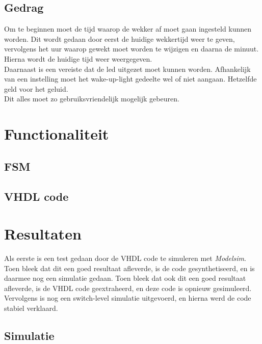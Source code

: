 \subsection{Gedrag}
Om te beginnen moet de tijd waarop de wekker af moet gaan ingesteld kunnen worden. Dit wordt gedaan door eerst de huidige wekkertijd weer te geven, vervolgens het uur waarop gewekt moet worden te wijzigen en daarna de minuut. Hierna wordt de huidige tijd weer weergegeven. \\
Daarnaast is een vereiste dat de led uitgezet moet kunnen worden. Afhankelijk van een instelling moet het wake-up-light gedeelte wel of niet aangaan. Hetzelfde geld voor het geluid. \\
Dit alles moet zo gebruiksvriendelijk mogelijk gebeuren.

\section{Functionaliteit}

\subsection{FSM}

\subsection{VHDL code}

\section{Resultaten}
Als eerste is een test gedaan door de VHDL code te simuleren met \emph{Modelsim}. Toen bleek dat dit een goed resultaat afleverde, is de code gesynthetiseerd, en is daarmee nog een simulatie gedaan. Toen bleek dat ook dit een goed resultaat afleverde, is de VHDL code geextraheerd, en deze code is opnieuw gesimuleerd. Vervolgens is nog een switch-level simulatie uitgevoerd, en hierna werd de code stabiel verklaard.

\subsection{Simulatie}

